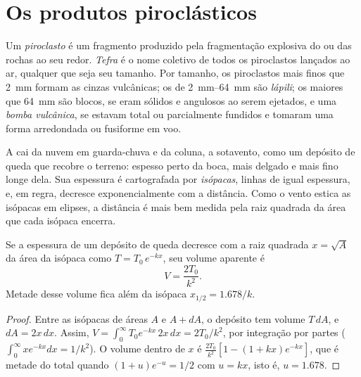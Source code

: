 \section{Os produtos piroclásticos}

\begin{definition}\label{def:b2:eruptive-styles:tephra}
Um \emph{piroclasto} é um fragmento produzido pela fragmentação
explosiva do  ou das rochas ao seu redor. \emph{Tefra} é
o nome coletivo de todos os piroclastos lançados ao ar, qualquer que seja seu tamanho.
Por tamanho, os piroclastos mais finos que \qty{2}{mm} formam as cinzas vulcânicas; os de
\qtyrange{2}{64}{mm} são \emph{lápili}; os maiores que
\qty{64}{mm} são blocos, se eram sólidos e angulosos ao serem ejetados, e uma
\emph{bomba vulcânica}, se estavam total ou parcialmente fundidos
e tomaram uma forma arredondada ou fusiforme em voo.
\end{definition}

A  cai da nuvem em guarda-chuva e da coluna, a sotavento, como um depósito de queda
que recobre o terreno: espesso perto da boca, mais delgado e mais fino longe dela. Sua
espessura é cartografada por \emph{isópacas}, linhas de igual espessura, e, em regra,
decresce exponencialmente com a distância. Como o vento estica as isópacas
em elipses, a distância é mais bem medida pela raiz quadrada da área que cada
isópaca encerra.

\begin{proposition}\label{prop:b2:eruptive-styles:thinning}
Se a espessura de um depósito de queda decresce com a raiz quadrada $x = \sqrt A$
da área da isópaca como $T = T_0\,e^{-kx}$, seu volume aparente é
\[
V = \frac{2T_0}{k^2}.
\]
Metade desse volume fica além da isópaca $x_{1/2} = 1.678/k$.
\end{proposition}

\begin{proof}
Entre as isópacas de áreas $A$ e $A + dA$, o depósito tem volume $T\,dA$,
e $dA = 2x\,dx$. Assim, $V = \int_0^\infty T_0e^{-kx}\,2x\,dx = 2T_0/k^2$, por
integração por partes ($\int_0^\infty xe^{-kx}dx = 1/k^2$). O volume dentro de $x$
é $\frac{2T_0}{k^2}[1 - (1 + kx)e^{-kx}]$, que é metade do total quando $(1 +
u)e^{-u} = 1/2$ com $u = kx$, isto é, $u = 1.678$.
\end{proof}

